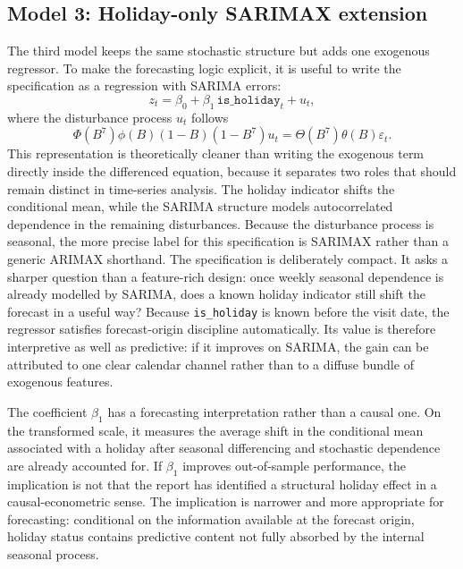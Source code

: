 \documentclass[11pt,oneside]{scrartcl}
\begin{document}
\subsection{Model 3: Holiday-only SARIMAX extension}
The third model keeps the same stochastic structure but adds one exogenous regressor. To make the forecasting logic explicit, it is useful to write the specification as a regression with SARIMA errors:
\[
z_t = \beta_0 + \beta_1 \,\texttt{is\_holiday}_t + u_t,
\]
where the disturbance process $u_t$ follows
\[
\Phi(B^7)\phi(B)(1-B)(1-B^7) u_t
=
\Theta(B^7)\theta(B)\varepsilon_t.
\]
This representation is theoretically cleaner than writing the exogenous term directly inside the differenced equation, because it separates two roles that should remain distinct in time-series analysis. The holiday indicator shifts the conditional mean, while the SARIMA structure models autocorrelated dependence in the remaining disturbances. Because the disturbance process is seasonal, the more precise label for this specification is SARIMAX rather than a generic ARIMAX shorthand. The specification is deliberately compact. It asks a sharper question than a feature-rich design: once weekly seasonal dependence is already modelled by SARIMA, does a known holiday indicator still shift the forecast in a useful way? Because \texttt{is\_holiday} is known before the visit date, the regressor satisfies forecast-origin discipline automatically. Its value is therefore interpretive as well as predictive: if it improves on SARIMA, the gain can be attributed to one clear calendar channel rather than to a diffuse bundle of exogenous features.

The coefficient $\beta_1$ has a forecasting interpretation rather than a causal one. On the transformed scale, it measures the average shift in the conditional mean associated with a holiday after seasonal differencing and stochastic dependence are already accounted for. If $\beta_1$ improves out-of-sample performance, the implication is not that the report has identified a structural holiday effect in a causal-econometric sense. The implication is narrower and more appropriate for forecasting: conditional on the information available at the forecast origin, holiday status contains predictive content not fully absorbed by the internal seasonal process.
\end{document}
